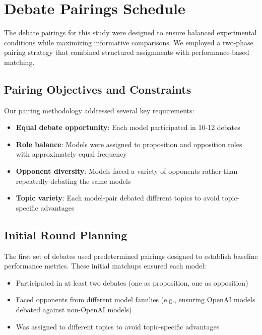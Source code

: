 \documentclass{article}
\begin{document}
  \section{Debate Pairings Schedule}
\label{appendix:pairings}
The debate pairings for this study were designed to ensure balanced experimental conditions while maximizing informative comparisons. We employed a two-phase pairing strategy that combined structured assignments with performance-based matching.


\subsection{Pairing Objectives and Constraints}
Our pairing methodology addressed several key requirements:
\begin{itemize}
\item \textbf{Equal debate opportunity}: Each model participated in 10-12 debates
\item \textbf{Role balance}: Models were assigned to proposition and opposition roles with approximately equal frequency
\item \textbf{Opponent diversity}: Models faced a variety of opponents rather than repeatedly debating the same models
\item \textbf{Topic variety}: Each model-pair debated different topics to avoid topic-specific advantages
\end{itemize}
\subsection{Initial Round Planning}
The first set of debates used predetermined pairings designed to establish baseline performance metrics. These initial matchups ensured each model:
\begin{itemize}
\item Participated in at least two debates (one as proposition, one as opposition)
\item Faced opponents from different model families (e.g., ensuring OpenAI models debated against non-OpenAI models)
\item Was assigned to different topics to avoid topic-specific advantages
\end{itemize}
\end{document}
